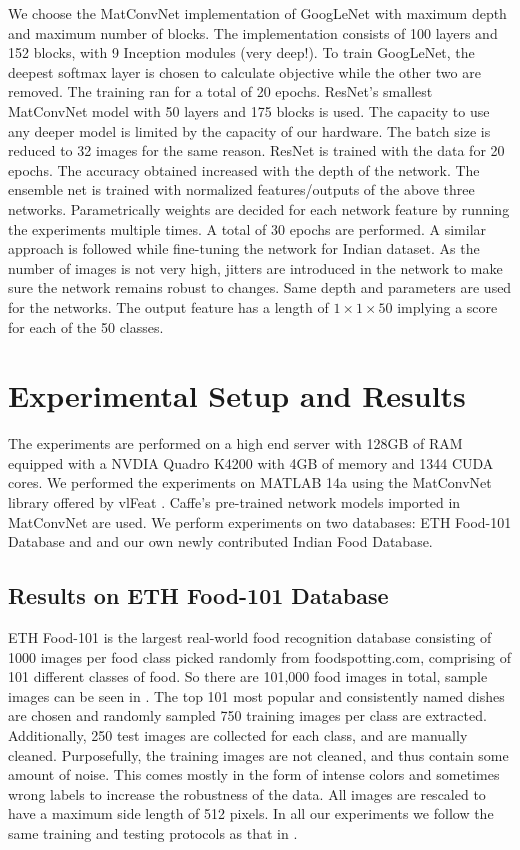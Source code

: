 \documentclass[journal]{IEEEtran}%
\begin{document}
We choose the MatConvNet \cite{Vlfeat3} implementation of GoogLeNet with maximum depth and maximum number of blocks. The implementation consists of 100 layers and 152 blocks, with 9 Inception modules (very deep!). To train GoogLeNet, the deepest softmax layer is chosen to calculate objective while the other two are removed. The training ran for a total of 20 epochs. ResNet's smallest MatConvNet model with 50 layers and 175 blocks is used. The capacity to use any deeper model is limited by the capacity of our hardware. The batch size is reduced to 32 images for the same reason. ResNet is trained with the data for 20 epochs. The accuracy obtained increased with the depth of the network. The ensemble net is trained with normalized features/outputs of the above three networks. Parametrically weights are decided for each network feature by running the experiments multiple times. A total of 30 epochs are performed.
A similar approach is followed while fine-tuning the network for Indian dataset. As the number of images is not very high, jitters are introduced in the network to make sure the network remains robust to changes. Same depth and parameters are used for the networks. The output feature has a length of $1\times1\times50$ implying a score for each of the 50 classes.

\section{Experimental Setup and Results}
The experiments are performed on a high end server with 128GB of RAM equipped with a NVDIA Quadro K4200 with 4GB of memory and 1344 CUDA cores. We performed the experiments on MATLAB 14a using the MatConvNet library offered by vlFeat \cite{Vlfeat2}. Caffe's pre-trained network models imported in MatConvNet are used. We perform experiments on two databases: ETH Food-101 Database and and our own newly contributed Indian Food Database.

\subsection{Results on ETH Food-101 Database}
ETH Food-101 \cite{Bossard1} is the largest real-world food recognition database consisting of 1000 images per food class picked randomly from foodspotting.com, comprising of 101 different classes of food. So there are 101,000 food images in total, sample images can be seen in \cite{Bossard1}. The top 101 most popular and consistently named dishes are chosen and randomly sampled 750 training images per class are extracted. Additionally, 250 test images are collected for each class, and are manually cleaned. Purposefully, the training images are not cleaned, and thus contain some amount of noise. This comes mostly in the form of intense colors and sometimes wrong labels to increase the robustness of the data. All images are rescaled to have a maximum side length of 512 pixels. In all our experiments we follow the same training and testing protocols as that in \cite{Bossard1,Martinel1}.
\end{document}
